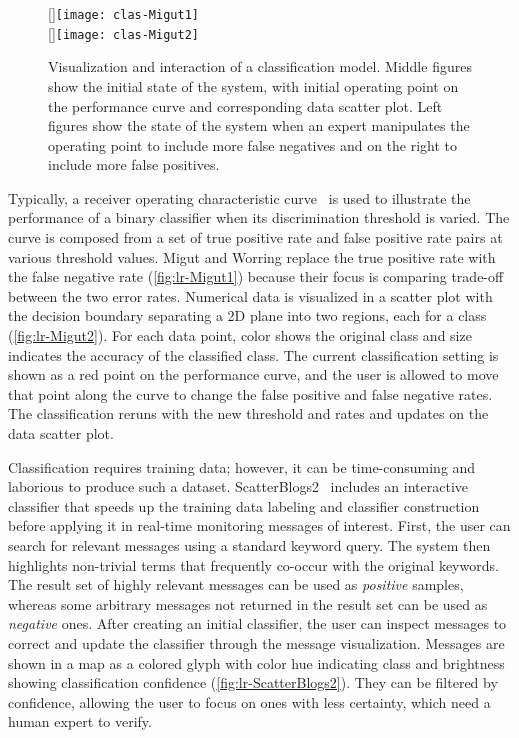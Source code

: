 \begin{figure}
\centering
{}[\columnwidth]{\texttt{[image: clas-Migut1]}}
\\
[\columnwidth]{\texttt{[image: clas-Migut2]}}
\caption[Visualization and interaction of a classification model]{Visualization and interaction of a classification model. Middle figures show the initial state of the system, with initial operating point on the performance curve and corresponding data scatter plot. Left figures show the state of the system when an expert manipulates the operating point to include more false negatives and on the right to include more false positives. }
\label{fig:lr-Migut}
\end{figure}

Typically, a receiver operating characteristic curve~\cite{Fawcett2006} is used to illustrate the performance of a binary classifier when its discrimination threshold is varied. The curve is composed from a set of true positive rate and false positive rate pairs at various threshold values. Migut and Worring replace the true positive rate with the false negative rate (\autoref{fig:lr-Migut1}) because their focus is comparing trade-off between the two error rates. Numerical data is visualized in a scatter plot with the decision boundary separating a 2D plane into two regions, each for a class (\autoref{fig:lr-Migut2}). For each data point, color shows the original class and size indicates the accuracy of the classified class. The current classification setting is shown as a red point on the performance curve, and the user is allowed to move that point along the curve to change the false positive and false negative rates. The classification reruns with the new threshold and rates and updates on the data scatter plot.

Classification requires training data; however, it can be time-consuming and laborious to produce such a dataset. ScatterBlogs2~\cite{Bosch2013} includes an interactive classifier that speeds up the training data labeling and classifier construction before applying it in real-time monitoring messages of interest. First, the user can search for relevant messages using a standard keyword query. The system then highlights non-trivial terms that frequently co-occur with the original keywords. The result set of highly relevant messages can be used as \emph{positive} samples, whereas some arbitrary messages not returned in the result set can be used as \emph{negative} ones. After creating an initial classifier, the user can inspect messages to correct and update the classifier through the message visualization. Messages are shown in a map as a colored glyph with color hue indicating class and brightness showing classification confidence (\autoref{fig:lr-ScatterBlogs2}). They can be filtered by confidence, allowing the user to focus on ones with less certainty, which need a human expert to verify.

